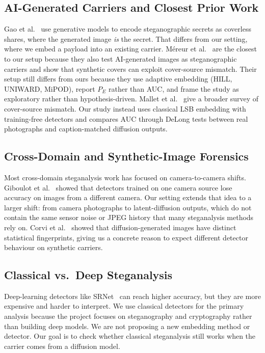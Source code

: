 \documentclass[10pt,twocolumn,a4paper]{article}
\begin{document}
\subsection{AI-Generated Carriers and Closest Prior Work}
Gao et al.~\cite{gao2022ai} use generative models to encode steganographic secrets as coverless shares, where the generated image \emph{is} the secret. That differs from our setting, where we embed a payload into an existing carrier. M\'{e}reur et al.~\cite{mereur2024deepfake} are the closest to our setup because they also test AI-generated images as steganographic carriers and show that synthetic covers can exploit cover-source mismatch. Their setup still differs from ours because they use adaptive embedding (HILL, UNIWARD, MiPOD), report $P_E$ rather than AUC, and frame the study as exploratory rather than hypothesis-driven. Mallet et al.~\cite{mallet2024csm} give a broader survey of cover-source mismatch. Our study instead uses classical LSB embedding with training-free detectors and compares AUC through DeLong tests between real photographs and caption-matched diffusion outputs.

\subsection{Cross-Domain and Synthetic-Image Forensics}
\label{sec:crossdomain}
Most cross-domain steganalysis work has focused on camera-to-camera shifts. Giboulot et al.~\cite{giboulot2020csm} showed that detectors trained on one camera source lose accuracy on images from a different camera. Our setting extends that idea to a larger shift: from camera photographs to latent-diffusion outputs, which do not contain the same sensor noise or JPEG history that many steganalysis methods rely on. Corvi et al.~\cite{corvi2023diffusion} showed that diffusion-generated images have distinct statistical fingerprints, giving us a concrete reason to expect different detector behaviour on synthetic carriers.

\subsection{Classical vs.\ Deep Steganalysis}
Deep-learning detectors like SRNet~\cite{boroumand2019srnet} can reach higher accuracy, but they are more expensive and harder to interpret. We use classical detectors for the primary analysis because the project focuses on steganography and cryptography rather than building deep models. We are not proposing a new embedding method or detector. Our goal is to check whether classical steganalysis still works when the carrier comes from a diffusion model.
\end{document}
